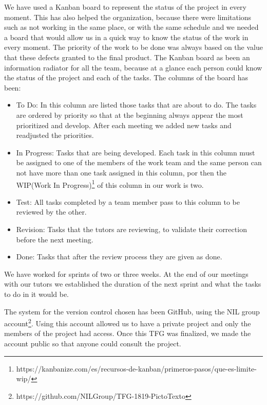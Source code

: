 We have used a Kanban board to represent the status of the project in every moment. This has also helped the organization, because there were limitations such as not working in the same place, or with the same schedule and we needed a board that would allow us in a quick way to know the status of the work in every moment. The priority of the work to be done was always based on the value that these defects granted to the final product. The Kanban board as been an information radiator for all the team, because at a glance each person could know the status of the project and each of the tasks. The columns of the board has been:

\begin{itemize}
\item To Do: In this column are listed those tasks that are about to do. The tasks are ordered by priority so that at the beginning always appear the most prioritized and develop. After each meeting we added new tasks and readjusted the priorities.

\item In Progress: Tasks that are being developed. Each task in this column must be assigned to one of the members of the work team and the same person can not have more than one task assigned in this column, por then the WIP(Work In Progress)\footnote{https://kanbanize.com/es/recursos-de-kanban/primeros-pasos/que-es-limite-wip/} of this column in our work is two. 
\item Test: All tasks completed by a team member pass to this column to be reviewed by the other.
\item Revision: Tasks that the tutors are reviewing, to validate their correction before the next meeting.
\item Done: Tasks that after the review process they are given as done.
\end{itemize}

We have worked for sprints of two or three weeks. At the end of our meetings with our tutors we established the duration of the next sprint and what the tasks to do in it would be. 

The system for the version control chosen has been GitHub, using the NIL group account\footnote{https://github.com/NILGroup/TFG-1819-PictoTexto}. Using this account allowed us to have a private project and only the members of the project had access. Once this TFG was finalized, we made the account public so that anyone could consult the project. 
